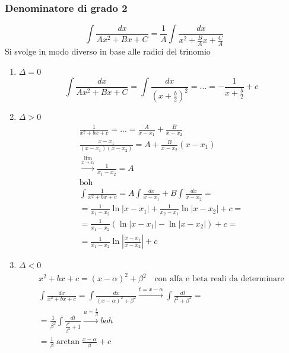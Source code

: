 \subsubsection{Denominatore di grado 2}
\begin{equation*}
    \int \frac{dx}{Ax^2+Bx+C} = \frac{1}{A} \int \frac{dx}{x^2+ \frac{B}{A}x + \frac{C}{A}}
\end{equation*}
Si svolge in modo diverso in base alle radici del trinomio
\begin{enumerate}
    \item $\Delta = 0$
        \begin{equation}
            \int \frac{dx}{Ax^2+Bx+C} = \int \frac{dx}{(x+ \frac{b}{2})^2}=...= -\frac{1}{x+ \frac{b}{2}} + c
        \end{equation}
    \item $\Delta > 0$
        \begin{gather*}
            \frac{1}{x^2+bx+c}=...= \frac{A}{x-x_1}+ \frac{B}{x-x_2} \\
            \frac{x-x_1}{(x-x_1)(x-x_2)} = A + \frac{B}{x-x_2}(x-x_1) \\
            \xrightarrow{\lim_{x\to x_1}} \frac{1}{x_1-x_2} = A \\
            \text{boh} \\
            \int \frac{1}{x^2+bx+c} = A\int \frac{dx}{x-x_1}+ B\int \frac{dx}{x-x_2} = \\
            = \frac{1}{x_1-x_2}\ln|x-x_1| + \frac{1}{x_2-x_1}\ln|x-x_2|+ c = \\
            = \frac{1}{x_1-x_2}(\ln|x-x_1| - \ln|x-x_2|) + c = \\
            = \frac{1}{x_1-x_2}\ln|\frac{x-x_1}{x-x_2}|+ c
        \end{gather*}
    \item $\Delta < 0$
        \begin{gather*}
            x^2 + bx + c = (x-\alpha)^2 + \beta^2\ \ \ \text{ con alfa e beta reali da determinare} \\
            \int \frac{dx}{x^2 + bx + c} = \int \frac{dx}{(x-\alpha)^2 + \beta^2} \xrightarrow{t = x-\alpha} \int \frac{dt}{t^2+\beta^2} =\\
            = \frac{1}{\beta^2}\int \frac{dt}{\frac{t^2}{\beta^2}+1} \xrightarrow{u= \frac{t}{\beta}} boh \\
            = \frac{1}{\beta} \arctan \frac{x-\alpha}{\beta} + c
        \end{gather*}
\end{enumerate}

